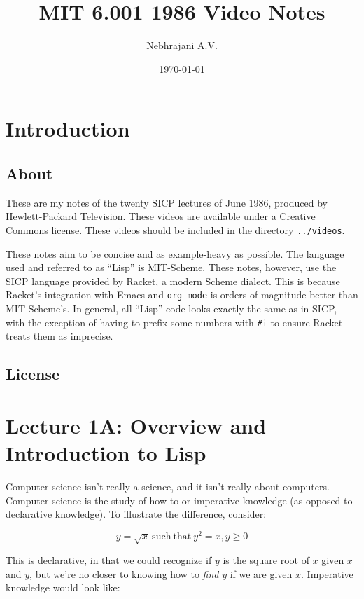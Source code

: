 \documentclass[9pt]{report}
\author{Nebhrajani A.V.}
\date{\today}
\title{MIT 6.001 1986 Video Notes}
\begin{document}
\maketitle
\tableofcontents


\chapter{Introduction}
\label{sec:org40f2f01}

\section{About}
\label{sec:org8e15309}
These are my notes of the twenty SICP lectures of June 1986,
produced by Hewlett-Packard Television. These videos are available
under a Creative Commons license. These videos should be included in
the directory \texttt{../videos}.

These notes aim to be concise and as example-heavy as possible. The
language used and referred to as ``Lisp'' is MIT-Scheme. These notes,
however, use the SICP language provided by Racket, a modern Scheme
dialect. This is because Racket's integration with Emacs and
\texttt{org-mode} is orders of magnitude better than MIT-Scheme's. In
general, all ``Lisp'' code looks exactly the same as in SICP, with the
exception of having to prefix some numbers with \texttt{\#i} to ensure
Racket treats them as imprecise.

\section{License}
\label{sec:orgd091ee4}
\doclicenseThis

\chapter{Lecture 1A: Overview and Introduction to Lisp}
\label{sec:org74ac6bc}

Computer science isn't really a science, and it isn't really about
computers. Computer science is the study of how-to or imperative
knowledge (as opposed to declarative knowledge). To illustrate the
difference, consider:

$$y = \sqrt{x} \mathrm{~such~that~} y^2=x, y \geq 0$$

This is declarative, in that we could recognize if \(y\) is the square
root of \(x\) given \(x\) and \(y\), but we're no closer to knowing how to
\emph{find} \(y\) if we are given \(x\). Imperative knowledge would look
like:
\end{document}
